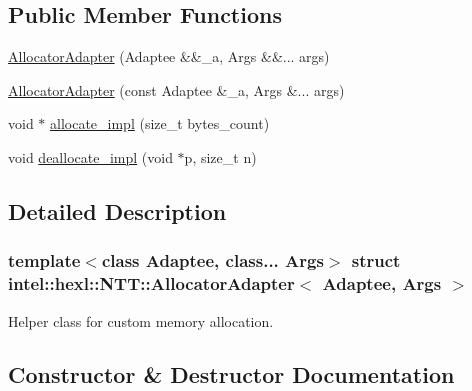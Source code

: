 \subsection*{Public Member Functions}
\begin{DoxyCompactItemize}
\item 
\hyperlink{structintel_1_1hexl_1_1NTT_1_1AllocatorAdapter_a4403f32f5ed5527a13c2bf12c20a68af}{Allocator\+Adapter} (Adaptee \&\&\+\_\+a, Args \&\&... args)
\item 
\hyperlink{structintel_1_1hexl_1_1NTT_1_1AllocatorAdapter_aee97fbd36cf2299db87f6dbe75f12396}{Allocator\+Adapter} (const Adaptee \&\+\_\+a, Args \&... args)
\item 
void $\ast$ \hyperlink{structintel_1_1hexl_1_1NTT_1_1AllocatorAdapter_a408a6a4b42aef1db5ab7e9b5c8ec2670}{allocate\+\_\+impl} (size\+\_\+t bytes\+\_\+count)
\item 
void \hyperlink{structintel_1_1hexl_1_1NTT_1_1AllocatorAdapter_a123aa02665ce9f2b219ca9b88164e114}{deallocate\+\_\+impl} (void $\ast$p, size\+\_\+t n)
\end{DoxyCompactItemize}


\subsection{Detailed Description}
\subsubsection*{template$<$class Adaptee, class... Args$>$\newline
struct intel\+::hexl\+::\+N\+T\+T\+::\+Allocator\+Adapter$<$ Adaptee, Args $>$}

Helper class for custom memory allocation. 

\subsection{Constructor \& Destructor Documentation}
\mbox{\label{structintel_1_1hexl_1_1NTT_1_1AllocatorAdapter_a4403f32f5ed5527a13c2bf12c20a68af}} 
